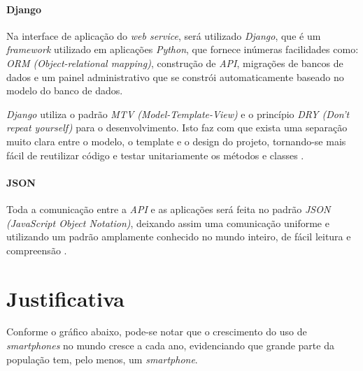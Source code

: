 \documentclass[
	12pt,
	oneside,
	a4paper,
	english,
	brazil,
]{abntex2}
\begin{document}
\subsubsection{Django}

Na interface de aplicação do \emph{web service}, será utilizado \emph{Django}, que é um \emph{framework} utilizado em aplicações \emph{Python}, que fornece inúmeras facilidades como: \emph{ORM (Object-relational mapping)}, construção de \emph{API}, migrações de bancos de dados e um painel administrativo que se constrói automaticamente baseado no modelo do banco de dados.

\emph{Django} utiliza o padrão \emph{MTV (Model-Template-View)} e o princípio \emph{DRY (Don't repeat yourself)} para o desenvolvimento. Isto faz com que exista uma separação muito clara entre o modelo, o template e o design do projeto, tornando-se mais fácil de reutilizar código e testar unitariamente os métodos e classes \cite{django-wikipedia}. 

\subsubsection{JSON}

Toda a comunicação entre a \emph{API} e as aplicações será feita no padrão \emph{JSON (JavaScript Object Notation)}, deixando assim uma comunicação uniforme e utilizando um padrão amplamente conhecido no mundo inteiro, de fácil leitura e compreensão \cite{footnote-json}.




\chapter{Justificativa}

Conforme o gráfico abaixo, pode-se notar que o crescimento do uso de \emph{smartphones} no mundo cresce a cada ano, evidenciando que grande parte da população tem, pelo menos, um \emph{smartphone}.
\end{document}

